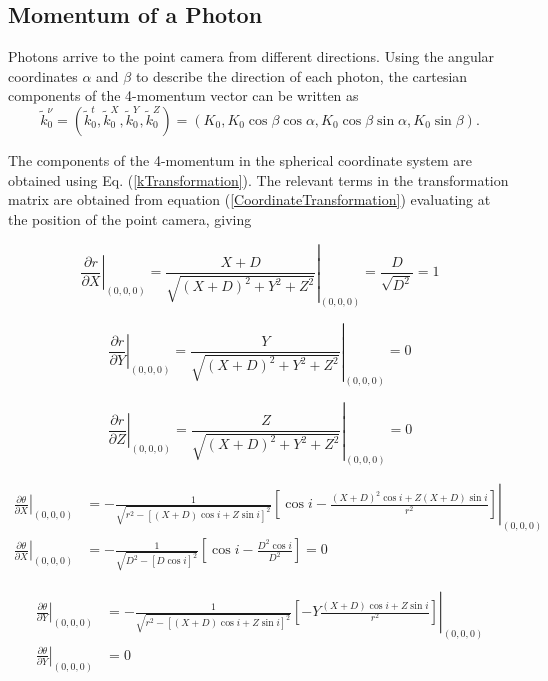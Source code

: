 \subsection{Momentum of a Photon}

Photons arrive to the point camera from different directions. Using the angular coordinates $\alpha$ and $\beta$ to describe the direction of each photon, the cartesian components of the 4-momentum vector can be written as
\begin{equation}
\tilde{k}^\nu_0 =\left( \tilde{k}^t_0, \tilde{k}^X_0, \tilde{k}^Y_0, \tilde{k}^Z_0 \right) = \left( K_0, K_0 \cos \beta \cos \alpha , K_0 \cos \beta \sin \alpha , K_0 \sin \beta \right).
\end{equation}

The components of the 4-momentum in the spherical coordinate system  are obtained using  Eq. (\ref{kTransformation}). The relevant terms in the transformation matrix are obtained from equation (\ref{CoordinateTransformation}) evaluating at the position of the point camera, giving

\begin{equation}
\left. \frac{\partial r}{\partial X} \right|_{(0,0,0)}= \left.\frac{X+D}{\sqrt{(X+D)^2 + Y^2 + Z^2}}\right|_{(0,0,0)}
= \frac{D}{\sqrt{D^2}} = 1
\end{equation}

\begin{equation}
\left. \frac{\partial r}{\partial Y} \right|_{(0,0,0)}= \left.\frac{Y}{\sqrt{(X+D)^2 + Y^2 + Z^2}}\right|_{(0,0,0)} = 0
\end{equation}

\begin{equation}
\left. \frac{\partial r}{\partial Z} \right|_{(0,0,0)}= \left.\frac{Z}{\sqrt{(X+D)^2 + Y^2 + Z^2}}\right|_{(0,0,0)} = 0
\end{equation}

\footnotesize
\begin{align}
\left. \frac{\partial \theta}{\partial X} \right|_{(0,0,0)} &= \left.-\frac{1}{\sqrt{r^2-[(X+D)\cos i + Z \sin i]^2}}  \left[ \cos i - \frac{(X+D)^2 \cos i + Z(X+D) \sin i}{r^2}\right]\right|_{(0,0,0)} \nonumber \\
\left. \frac{\partial \theta}{\partial X} \right|_{(0,0,0)} &= -\frac{1}{\sqrt{D^2 -[D\cos i ]^2}}  \left[ \cos i - \frac{D^2 \cos i }{D^2}\right]=0
\end{align}
\normalsize

\footnotesize
\begin{align}
\left. \frac{\partial \theta}{\partial Y} \right|_{(0,0,0)} &= \left.-\frac{1}{\sqrt{r^2-[(X+D)\cos i + Z \sin i]^2}}  \left[ -Y \frac{(X+D) \cos i + Z \sin i}{r^2}\right]\right|_{(0,0,0)} \nonumber \\
\left. \frac{\partial \theta}{\partial Y} \right|_{(0,0,0)} &=0
\end{align}
\normalsize


